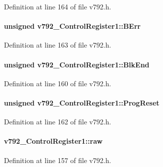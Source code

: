 Definition at line 164 of file v792.h.
\paragraph[{BErr}]{\setlength{\rightskip}{0pt plus 5cm}unsigned {\bf v792\_\-ControlRegister1::BErr}}\hfill\label{unionv792__ControlRegister1_a322587b546de27131df7667249fdb241}


Definition at line 163 of file v792.h.
\paragraph[{BlkEnd}]{\setlength{\rightskip}{0pt plus 5cm}unsigned {\bf v792\_\-ControlRegister1::BlkEnd}}\hfill\label{unionv792__ControlRegister1_a7a1822d4e0e9564846b43108ed0275f7}


Definition at line 160 of file v792.h.
\paragraph[{ProgReset}]{\setlength{\rightskip}{0pt plus 5cm}unsigned {\bf v792\_\-ControlRegister1::ProgReset}}\hfill\label{unionv792__ControlRegister1_a440122d193870f766f7b632177c5bdf4}


Definition at line 162 of file v792.h.
\paragraph[{raw}]{ {\bf v792\_\-ControlRegister1::raw}}\hfill\label{unionv792__ControlRegister1_a4940b5767b8cd5b96cd9f7b583af79f6}


Definition at line 157 of file v792.h.